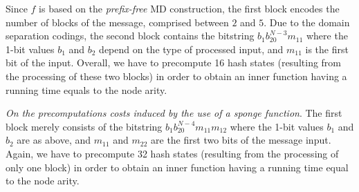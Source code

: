 \documentclass{llncs}
\renewcommand{\paragraph}[1]{\noindent\textit{#1}.}
\begin{document}
Since $f$ is based on the \emph{prefix-free} MD construction, the first block encodes the number of blocks of the message, comprised between $2$ and $5$. 
Due to the domain separation codings,
the second block contains the bitstring $b_1b_20^{N-3}m_{11}$ where the 1-bit values $b_1$ and $b_2$ depend on the type of processed input, 
and $m_{11}$ is the first bit of the input. Overall, we have to precompute 16 hash states (resulting from the processing of these two blocks) in order to
obtain an inner function having a running time equals to the node arity.

\paragraph{On the precomputations costs induced by the use of a sponge function}
The first block merely consists of the bitstring $b_1b_20^{N-4}m_{11}m_{12}$ where the 1-bit values $b_1$ and $b_2$ are as above,
and $m_{11}$ and $m_{22}$ are the first two bits of the message input. Again, we have to precompute 32 hash states (resulting from the processing of only one block) 
in order to obtain an inner function having a running time equal to the node arity.
\end{document}

